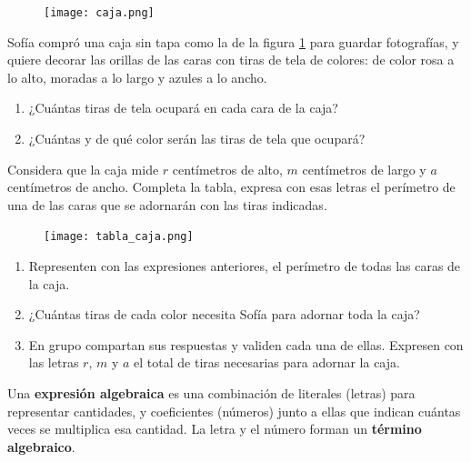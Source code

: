 \documentclass[11pt]{book}
\begin{document}
\begin{enumerate}
  \begin{minipage}[t]{.2\textwidth}
    \begin{figure}[H]
      \centering
      \texttt{[image: caja.png]}
      \label{fig:caja}
    \end{figure}
  \end{minipage}\hfill
  \begin{minipage}[t]{.7\textwidth}
    \item Sofía compró una caja sin tapa como la de la figura \ref{fig:caja} para guardar fotografías,
    y quiere decorar las orillas de las caras con tiras de tela de colores: de color rosa
    a lo alto, moradas a lo largo y azules a lo ancho.

    \begin{enumerate}
      \item ¿Cuántas tiras de tela ocupará en cada cara de la caja?
      \item ¿Cuántas y de qué color serán las tiras de tela que ocupará?
    \end{enumerate}
  \end{minipage}

  \item Considera que la caja mide $r$ centímetros de alto, $m$ centímetros de largo
        y $a$ centímetros de ancho. Completa la tabla, expresa con esas letras el perímetro
        de una de las caras que se adornarán con las tiras indicadas.
        \begin{figure}[H]
          \centering
          \texttt{[image: tabla\_caja.png]}
          \label{fig:tabla_caja}
        \end{figure}
        \begin{enumerate}
          \item Representen con las expresiones anteriores, el perímetro de todas las caras de la
                caja.
          \item ¿Cuántas tiras de cada color necesita Sofía para adornar toda la caja?
          \item En grupo compartan sus respuestas y validen cada una de ellas. Expresen con
                las letras $r$, $m$ y $a$ el total de tiras necesarias para adornar la caja.
        \end{enumerate}

        \begin{boxH}
          Una \textbf{expresión algebraica} es una combinación de literales (letras) para representar
          cantidades, y coeficientes (números) junto a ellas que indican cuántas veces se
          multiplica esa cantidad. La letra y el número forman un \textbf{término algebraico}.
        \end{boxH}


\end{enumerate}
\end{document}
